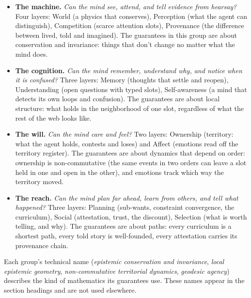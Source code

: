 \documentclass[11pt]{article}
\theoremstyle{remark}
\begin{document}
\begin{itemize}[nosep]
    \item \textbf{The machine.} \emph{Can the mind see, attend, and tell evidence from
    hearsay?} Four layers: World (a physics that conserves), Perception (what the agent can
    distinguish), Competition (scarce attention slots), Provenance (the difference between
    lived, told and imagined). The guarantees in this group are about conservation and
    invariance: things that don't change no matter what the mind does.

    \item \textbf{The cognition.} \emph{Can the mind remember, understand why, and notice
    when it is confused?} Three layers: Memory (thoughts that settle and reopen),
    Understanding (open questions with typed slots), Self-awareness (a mind that detects
    its own loops and confusion). The guarantees are about local structure: what holds in
    the neighborhood of one slot, regardless of what the rest of the web looks like.

    \item \textbf{The will.} \emph{Can the mind care and feel?} Two layers: Ownership
    (territory: what the agent holds, contests and loses) and Affect (emotions read off
    the territory register). The guarantees are about dynamics that depend on order:
    ownership is non-commutative (the same events in two orders can leave a slot held in
    one and open in the other), and emotions track which way the territory moved.

    \item \textbf{The reach.} \emph{Can the mind plan far ahead, learn from others, and
    tell what happened?} Three layers: Planning (sub-wants, constraint convergence, the
    curriculum), Social (attestation, trust, the discount), Selection (what is worth
    telling, and why). The guarantees are about paths: every curriculum is a shortest
    path, every told story is well-founded, every attestation carries its provenance chain.
\end{itemize}

Each group's technical name (\emph{epistemic conservation and invariance}, \emph{local
epistemic geometry}, \emph{non-commutative territorial dynamics}, \emph{geodesic agency})
describes the kind of mathematics its guarantees use. These names appear in the section
headings and are not used elsewhere.
\end{document}
